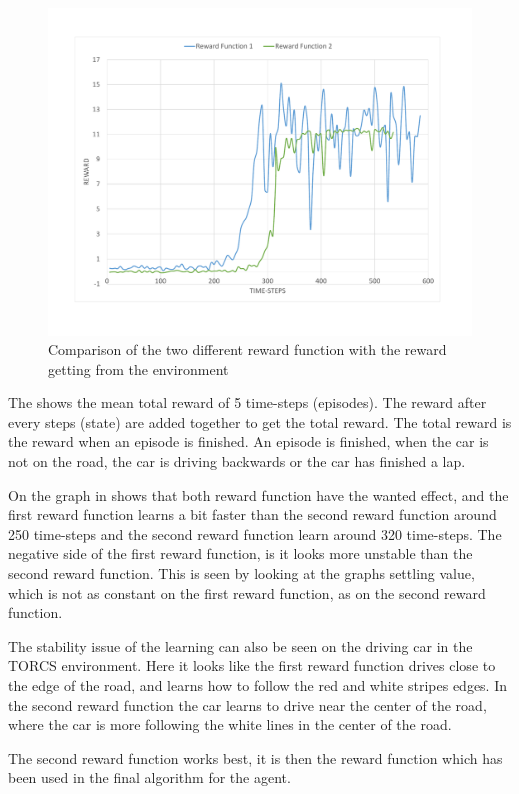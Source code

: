 \begin{figure}[H]
	\centering
	\includegraphics[width=1\textwidth]{Figures/Result/change_of_Reward_reward_graph.pdf}
	\caption{Comparison of the two different reward function with the reward getting from the environment}
	\label{fig:change_of_Reward_reward_graph}
\end{figure}

The  shows the mean total reward of 5 time-steps (episodes). The reward after every steps (state) are added together to get the total reward. The total reward is the reward when an episode is finished. An episode is finished, when the car is not on the road, the car is driving backwards or the car has finished a lap.   

On the graph in  shows that both reward function have the wanted effect, and the first reward function learns a bit faster than the second reward function around 250 time-steps and the second reward function learn around 320 time-steps. The negative side of the first reward function, is it looks more unstable than the second reward function. This is seen by looking at the graphs settling value, which is not as constant on the first reward function, as on the second reward function. 

The stability issue of the learning can also be seen on the driving car in the TORCS environment. Here it looks like the first reward function drives close to the edge of the road, and learns how to follow the red and white stripes edges. In the second reward function the car learns to drive near the center of the road, where the car is more following the white lines in the center of the road. 

The second reward function works best, it is then the reward function which has been used in the final algorithm for the agent.  
